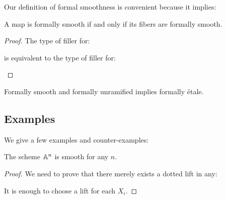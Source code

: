 Our definition of formal smoothness is convenient because it implies:

\begin{lemma}
A map is formally smooth if and only if its fibers are formally smooth.
\end{lemma}
\begin{proof}
The type of filler for:
 \begin{center}
    \end{center}
   is equivalent to the type of filler for:
    \begin{center}
    \end{center}
\end{proof}

\begin{remark}
Formally smooth and formally unramified implies formally étale.
\end{remark}

\subsection{Examples}

We give a few examples and counter-examples:

\begin{lemma}
The scheme $\mathbb{A}^n$ is smooth for any $n$.
\end{lemma}

\begin{proof}
We need to prove that there merely exists a dotted lift in any:
 \begin{center}
    \end{center}
    It is enough to choose a lift for each $X_i$.
\end{proof}

